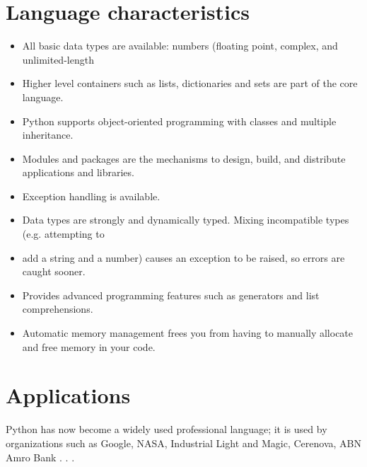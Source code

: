 \documentclass[]{book}
\begin{document}
    \section* {Language characteristics}
        \begin{itemize}
            \item All basic data types are available: numbers (floating point, complex, and unlimited-length
            \item Higher level containers such as lists, dictionaries and sets are part of the core language.
            \item Python supports object-oriented programming with classes and multiple inheritance.
            \item Modules and packages are the mechanisms to design, build, and distribute applications and libraries.
            \item Exception handling is available.
            \item Data types are strongly and dynamically typed. Mixing incompatible types (e.g. attempting to
            \item add a string and a number) causes an exception to be raised, so errors are caught sooner.
            \item Provides advanced programming features such as generators and list comprehensions.
            \item Automatic memory management frees you from having to manually allocate and free memory in your code.
        \end{itemize}
    \section*{Applications}
    Python has now become a widely used professional language; it is used by organizations such as Google, NASA, Industrial Light and Magic, Cerenova, ABN Amro Bank . . .
    
\end{document}
